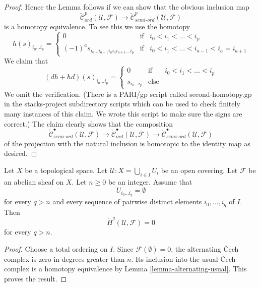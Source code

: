 \begin{proof}
\medskip\noindent
Hence the Lemma follows if we can show that the obvious inclusion map
$$
\check{\mathcal{C}}_{ord}^p(\mathcal{U}, \mathcal{F})
\longrightarrow
\check{\mathcal{C}}_{semi\text{-}ord}^p(\mathcal{U}, \mathcal{F})
$$
is a homotopy equivalence. To see this we use the homotopy
\begin{equation}
\label{equation-second-homotopy}
h(s)_{i_0 \ldots i_p} =
\left\{
\begin{matrix}
0 & \text{if} & i_0 < i_1 < \ldots < i_p \\
(-1)^a s_{i_0 \ldots i_{a - 1} i_a i_a i_{a + 1} \ldots i_p}
& \text{if} & i_0 < i_1 < \ldots < i_{a - 1} < i_a = i_{a + 1}
\end{matrix}
\right.
\end{equation}
We claim that
$$
(dh + hd)(s)_{i_0 \ldots i_p} =
\left\{
\begin{matrix}
0 & \text{if} & i_0 < i_1 < \ldots < i_p \\
s_{i_0 \ldots i_p}
& \text{else} &
\end{matrix}
\right.
$$
We omit the verification. (There is a PARI/gp script called second-homotopy.gp
in the stacks-project subdirectory scripts which can be used to check
finitely many instances of this claim.
We wrote this script to make sure the signs are correct.)
The claim clearly shows that the composition
$$
\check{\mathcal{C}}_{semi\text{-}ord}^\bullet(\mathcal{U}, \mathcal{F})
\longrightarrow
\check{\mathcal{C}}_{ord}^\bullet(\mathcal{U}, \mathcal{F})
\longrightarrow
\check{\mathcal{C}}_{semi\text{-}ord}^\bullet(\mathcal{U}, \mathcal{F})
$$
of the projection with the natural inclusion
is homotopic to the identity map as desired.
\end{proof}

\begin{lemma}
\label{lemma-cech-vanishing-cover-dimension}
\begin{reference}
\cite[Chapter I, \S 3, no. 20, Corollary, p. 214]{FAC}
\end{reference}
Let $X$ be a topological space. Let
$\mathcal{U} : X = \bigcup_{i \in I} U_i$ be an open covering. Let
$\mathcal{F}$ be an abelian sheaf on $X$. Let $n \geq 0$ be an integer.
Assume that
$$
U_{i_0 \ldots i_q} = \emptyset
$$
for every $q > n$ and every sequence of pairwise distinct elements
$i_0, \ldots, i_q$ of $I$. Then
$$
\check{H}^q(\mathcal{U}, \mathcal{F}) = 0
$$
for every $q > n$.
\end{lemma}

\begin{proof}
Choose a total ordering on $I$. Since $\mathcal{F}(\emptyset) = 0$, the
alternating \v{C}ech complex is zero in degrees greater than $n$.
Its inclusion into the usual \v{C}ech complex is a homotopy equivalence
by Lemma \ref{lemma-alternating-usual}. This proves the result.
\end{proof}

